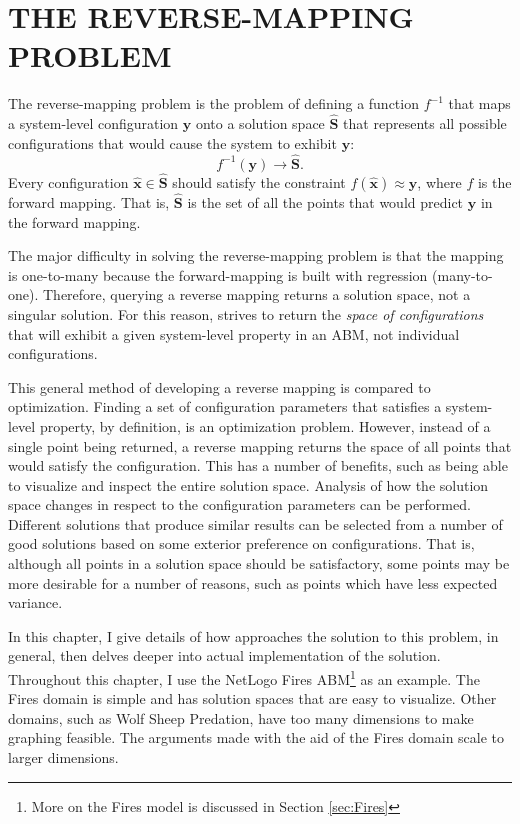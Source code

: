 \chapter{THE REVERSE-MAPPING PROBLEM}
\thispagestyle{plain}

\label{ReverseMapping}

The reverse-mapping problem is the problem of defining a function $f^{-1}$ that maps a system-level configuration $\mathbf y$ onto a solution space $\hat{\mathbf S}$ that represents all possible configurations that would cause the system to exhibit $\mathbf y$:
   \[ f^{-1}(\mathbf y) \rightarrow \hat{\mathbf S}. \]
Every configuration $\hat {\mathbf x} \in \hat {\mathbf S}$ should satisfy the constraint $f(\hat{\mathbf x}) \approx \mathbf y$, where $f$ is the forward mapping.
That is, $\hat{\mathbf S}$ is the set of all the points that would predict $\mathbf y$ in the forward mapping.

The major difficulty in solving the reverse-mapping problem is that the mapping is one-to-many because the forward-mapping is built with regression (many-to-one).
Therefore, querying a reverse mapping returns a solution space, not a singular solution.
For this reason, \fw strives to return the \textit{space of configurations} that will exhibit a given system-level property in an ABM, not individual configurations.

This general method of developing a reverse mapping is compared to optimization.
Finding a set of configuration parameters that satisfies a system-level property, by definition, is an optimization problem.
However, instead of a single point being returned, a reverse mapping returns the space of all points that would satisfy the configuration.
This has a number of benefits, such as being able to visualize and inspect the entire solution space.
Analysis of how the solution space changes in respect to the configuration parameters can be performed.
Different solutions that produce similar results can be selected from a number of good solutions based on some exterior preference on configurations.
That is, although all points in a solution space should be satisfactory, some points may be more desirable for a number of reasons, such as points which have less expected variance.

In this chapter, I give details of how \fw approaches the solution to this problem, in general, then delves deeper into actual implementation of the solution.
Throughout this chapter, I use the NetLogo Fires ABM\footnote{More on the Fires model is discussed in Section \ref{sec:Fires}} as an example.
The Fires domain is simple and has solution spaces that are easy to visualize.
Other domains, such as Wolf Sheep Predation, have too many dimensions to make graphing feasible.
The arguments made with the aid of the Fires domain scale to larger dimensions.



